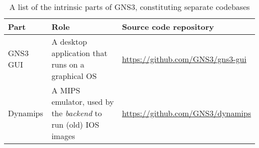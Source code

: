 \begin{table}
  \centering
  \small
  \begin{tabulary}{0.8\textwidth}{lLL}
    \toprule
      \textbf{Part}  & \textbf{Role}                                                       & \textbf{Source code repository}\\
    \midrule
      GNS3 GUI       & A desktop application that runs on a graphical OS                   & \scriptsize\url{https://github.com/GNS3/gns3-gui}\\
      Dynamips       & A MIPS emulator, used by the \emph{backend} to run (old) IOS images & \scriptsize\url{https://github.com/GNS3/dynamips}\\
    \bottomrule
  \end{tabulary}
  \caption{%
    A list of the intrinsic parts of GNS3, constituting separate codebases
  }
  \label{tab:gns3components}
\end{table}
